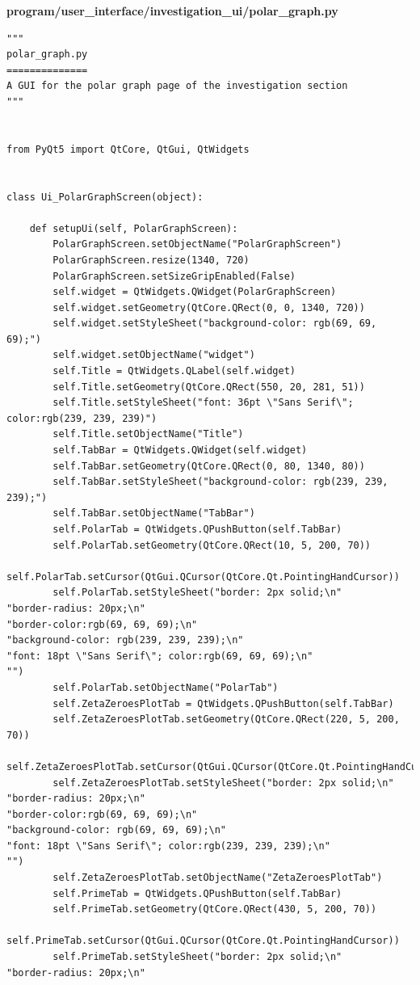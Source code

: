 \documentclass{article}
\begin{document}
\textbf{program/user\_interface/investigation\_ui/polar\_graph.py}
\begin{lstlisting}
"""
polar_graph.py
==============
A GUI for the polar graph page of the investigation section
"""


from PyQt5 import QtCore, QtGui, QtWidgets


class Ui_PolarGraphScreen(object):

    def setupUi(self, PolarGraphScreen):
        PolarGraphScreen.setObjectName("PolarGraphScreen")
        PolarGraphScreen.resize(1340, 720)
        PolarGraphScreen.setSizeGripEnabled(False)
        self.widget = QtWidgets.QWidget(PolarGraphScreen)
        self.widget.setGeometry(QtCore.QRect(0, 0, 1340, 720))
        self.widget.setStyleSheet("background-color: rgb(69, 69, 69);")
        self.widget.setObjectName("widget")
        self.Title = QtWidgets.QLabel(self.widget)
        self.Title.setGeometry(QtCore.QRect(550, 20, 281, 51))
        self.Title.setStyleSheet("font: 36pt \"Sans Serif\"; color:rgb(239, 239, 239)")
        self.Title.setObjectName("Title")
        self.TabBar = QtWidgets.QWidget(self.widget)
        self.TabBar.setGeometry(QtCore.QRect(0, 80, 1340, 80))
        self.TabBar.setStyleSheet("background-color: rgb(239, 239, 239);")
        self.TabBar.setObjectName("TabBar")
        self.PolarTab = QtWidgets.QPushButton(self.TabBar)
        self.PolarTab.setGeometry(QtCore.QRect(10, 5, 200, 70))
        self.PolarTab.setCursor(QtGui.QCursor(QtCore.Qt.PointingHandCursor))
        self.PolarTab.setStyleSheet("border: 2px solid;\n"
"border-radius: 20px;\n"
"border-color:rgb(69, 69, 69);\n"
"background-color: rgb(239, 239, 239);\n"
"font: 18pt \"Sans Serif\"; color:rgb(69, 69, 69);\n"
"")
        self.PolarTab.setObjectName("PolarTab")
        self.ZetaZeroesPlotTab = QtWidgets.QPushButton(self.TabBar)
        self.ZetaZeroesPlotTab.setGeometry(QtCore.QRect(220, 5, 200, 70))
        self.ZetaZeroesPlotTab.setCursor(QtGui.QCursor(QtCore.Qt.PointingHandCursor))
        self.ZetaZeroesPlotTab.setStyleSheet("border: 2px solid;\n"
"border-radius: 20px;\n"
"border-color:rgb(69, 69, 69);\n"
"background-color: rgb(69, 69, 69);\n"
"font: 18pt \"Sans Serif\"; color:rgb(239, 239, 239);\n"
"")
        self.ZetaZeroesPlotTab.setObjectName("ZetaZeroesPlotTab")
        self.PrimeTab = QtWidgets.QPushButton(self.TabBar)
        self.PrimeTab.setGeometry(QtCore.QRect(430, 5, 200, 70))
        self.PrimeTab.setCursor(QtGui.QCursor(QtCore.Qt.PointingHandCursor))
        self.PrimeTab.setStyleSheet("border: 2px solid;\n"
"border-radius: 20px;\n"

\end{lstlisting}
\end{document}
